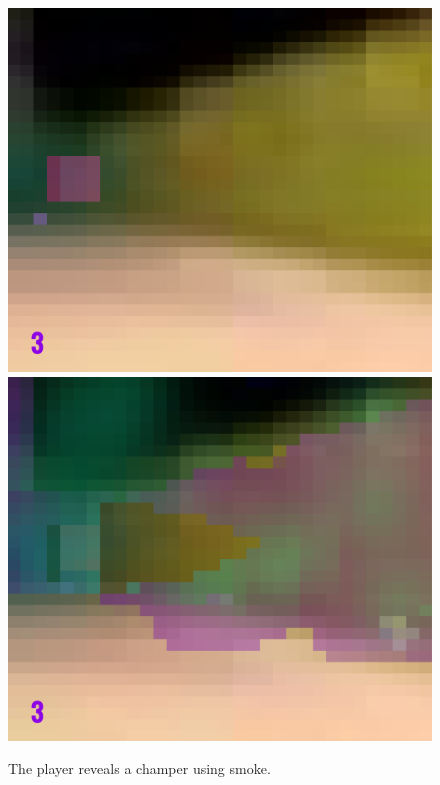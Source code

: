 \begin{figure}[p]
  \centering
  \includegraphics[width=\imgWidth]{images/game_systems/ChamperNoSmoke.png} \\[\picVdist]
  \includegraphics[width=\imgWidth]{images/game_systems/ChamperInSmoke.png}
  \caption{The player reveals a champer using smoke.}
  \label{UncoverChamper}
\end{figure}
